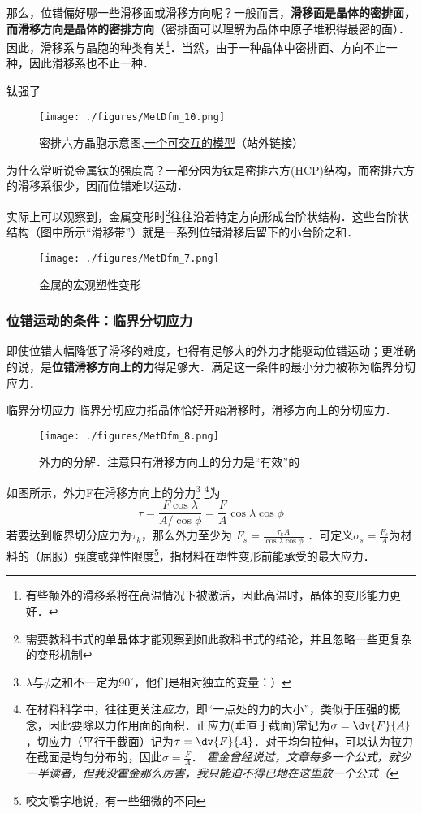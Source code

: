 那么，位错偏好哪一些滑移面或滑移方向呢？一般而言，\textbf{滑移面是晶体的密排面，而滑移方向是晶体的密排方向}（密排面可以理解为晶体中原子堆积得最密的面）．因此，滑移系与晶胞的种类有关\footnote{有些额外的滑移系将在高温情况下被激活，因此高温时，晶体的变形能力更好．}．当然，由于一种晶体中密排面、方向不止一种，因此滑移系也不止一种．

\begin{example}{钛强了}
\begin{figure}[ht]
\centering
\texttt{[image: ./figures/MetDfm\_10.png]}
\caption{密排六方晶胞示意图,\href{https://www.geogebra.org/m/xrzejabt}{一个可交互的模型}（站外链接）} \label{MetDfm_fig10}
\end{figure}
为什么常听说金属钛的强度高？一部分因为钛是密排六方(HCP)结构，而密排六方的滑移系很少，因而位错难以运动．
\end{example}

实际上可以观察到，金属变形时\footnote{需要教科书式的单晶体才能观察到如此教科书式的结论，并且忽略一些更复杂的变形机制}往往沿着特定方向形成台阶状结构．这些台阶状结构（图中所示“滑移带”）就是一系列位错滑移后留下的小台阶之和．
\begin{figure}[ht]
\centering
\texttt{[image: ./figures/MetDfm\_7.png]}
\caption{金属的宏观塑性变形} \label{MetDfm_fig7}
\end{figure}

\subsubsection{位错运动的条件：临界分切应力}
即使位错大幅降低了滑移的难度，也得有足够大的外力才能驱动位错运动；更准确的说，是\textbf{位错滑移方向上的力}得足够大．满足这一条件的最小分力被称为临界分切应力．

\begin{definition}{临界分切应力}
临界分切应力指晶体恰好开始滑移时，滑移方向上的分切应力．
\end{definition}

\begin{figure}[ht]
\centering
\texttt{[image: ./figures/MetDfm\_8.png]}
\caption{外力的分解．注意只有滑移方向上的分力是“有效”的} \label{MetDfm_fig8}
\end{figure}

如图所示，外力F在滑移方向上的分力\footnote{$\lambda$与$\phi$之和不一定为$90^\circ$，他们是相对独立的变量：）} \footnote{在材料科学中，往往更关注\textsl{应力}，即“一点处的力的大小”，类似于压强的概念，因此要除以力作用面的面积．正应力(垂直于截面)常记为$\sigma=\dv{F}{A}$，切应力（平行于截面）记为$\tau=\dv{F}{A}$．对于均匀拉伸，可以认为拉力在截面是均匀分布的，因此$\sigma=\frac{F}{A}$． \textsl{霍金曾经说过，文章每多一个公式，就少一半读者，但我没霍金那么厉害，我只能迫不得已地在这里放一个公式（}}为
\begin{equation}
\tau=\frac{F \cos \lambda}{A/{\cos \phi}}=\frac{F}{A}{\cos \lambda}{\cos \phi}
\end{equation}
若要达到临界切分应力为$\tau_k$，那么外力至少为 $F_s=\frac{\tau_k A}{\cos \lambda \cos \phi} $ ．可定义$\sigma_s=\frac{F_s}{A}$为材料的（屈服）强度或弹性限度\footnote{咬文嚼字地说，有一些细微的不同}，指材料在塑性变形前能承受的最大应力．

